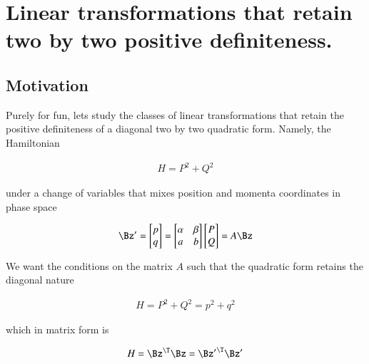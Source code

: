 %

\chapter{Linear transformations that retain two by two positive definiteness.}
\label{chap:quadraticForm}
{}
\date{Oct 4, 2009}

\beginArtWithToc

\section{Motivation}

Purely for fun, lets study the classes of linear transformations that retain the positive definiteness of a diagonal two by two quadratic form.  Namely, the Hamiltonian

\begin{align}\label{eqn:quadratricForm:voo1}
H = P^2 + Q^2
\end{align}

under a change of variables that mixes position and momenta coordinates in phase space

\begin{align}\label{eqn:quadratricForm:voo2}
\Bz' =
\begin{bmatrix}
p \\
q
\end{bmatrix}
=
\begin{bmatrix}
\alpha & \beta \\
a      & b \\
\end{bmatrix}
\begin{bmatrix}
P \\
Q
\end{bmatrix}
= A \Bz
\end{align}

We want the conditions on the matrix $A$ such that the quadratic form retains the diagonal nature

\begin{align}\label{eqn:quadratricForm:voo3a}
H = P^2 + Q^2 = p^2 + q^2
\end{align}

which in matrix form is

\begin{align}\label{eqn:quadratricForm:voo3}
H = \Bz^\T \Bz = {\Bz'}^\T \Bz' 
\end{align}

